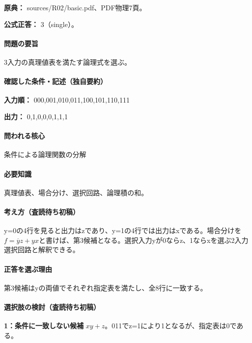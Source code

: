 \noindent\textbf{原典：} sources/R02/basic.pdf、PDF物理7頁。

\textbf{公式正答：} 3（single）。

\paragraph{問題の要旨} 3入力の真理値表を満たす論理式を選ぶ。

\paragraph{確認した条件・記述（独自要約）}\mbox{}\par

\noindent\textbf{入力順：} 000,001,010,011,100,101,110,111\par

\noindent\textbf{出力：} 0,1,0,0,0,1,1,1\par

\paragraph{問われる核心} 条件による論理関数の分解

\paragraph{必要知識} 真理値表、場合分け、選択回路、論理積の和。

\paragraph{考え方（査読待ち初稿）} y=\allowbreak{}0の4行を見ると出力はzであり、y=\allowbreak{}1の4行では出力はxである。場合分けを\(f=\overline y z+yx\)と書けば、第3候補となる。選択入力yが0ならz、1ならxを選ぶ2入力選択回路と解釈できる。

\paragraph{正答を選ぶ理由} 第3候補はyの両値でそれぞれ指定表を満たし、全8行に一致する。

\paragraph{選択肢の検討（査読待ち初稿）}\mbox{}\par

\noindent\textbf{1：条件に一致しない候補} \(xy+z\)。011でz=\allowbreak{}1により1となるが、指定表は0である。\par

